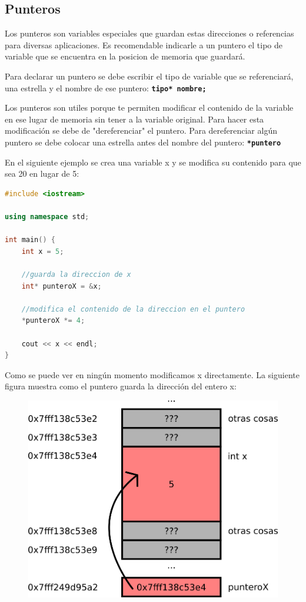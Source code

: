 \documentclass{article}
\begin{document}
\subsection{Punteros}

Los punteros son variables especiales que guardan estas direcciones o referencias para diversas aplicaciones. Es recomendable indicarle a un puntero el tipo de variable que se encuentra en la posicion de memoria que guardará.

Para declarar un puntero se debe escribir el tipo de variable que se referenciará, una estrella y el nombre de ese puntero: \textbf{\lstinline{tipo* nombre;}}

Los punteros son utiles porque te permiten modificar el contenido de la variable en ese lugar de memoria sin tener a la variable original. Para hacer esta modificación se debe de "dereferenciar" el puntero. Para dereferenciar algún puntero se debe colocar una estrella antes del nombre del puntero: \textbf{\lstinline{*puntero}}

En el siguiente ejemplo se crea una variable x y se modifica su contenido para que sea 20 en lugar de 5:

\begin{lstlisting}[language=C++, title=Referencias]
#include <iostream>

using namespace std;

int main() {
	int x = 5;

	//guarda la direccion de x
	int* punteroX = &x;

	//modifica el contenido de la direccion en el puntero
	*punteroX *= 4;

	cout << x << endl;
}
\end{lstlisting}

Como se puede ver en ningún momento modificamos x directamente. La siguiente figura muestra como el puntero guarda la dirección del entero x:

\begin{figure}[H]
    \centering
    \includegraphics[width=0.4\paperwidth]{puntero}
\end{figure}
\end{document}
